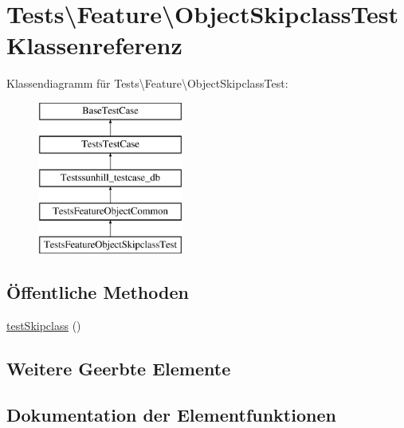 \hypertarget{classTests_1_1Feature_1_1ObjectSkipclassTest}{}\section{Tests\textbackslash{}Feature\textbackslash{}Object\+Skipclass\+Test Klassenreferenz}
\label{classTests_1_1Feature_1_1ObjectSkipclassTest}
Klassendiagramm für Tests\textbackslash{}Feature\textbackslash{}Object\+Skipclass\+Test\+:\begin{figure}[H]
\begin{center}
\leavevmode
\includegraphics[height=5.000000cm]{d2/d03/classTests_1_1Feature_1_1ObjectSkipclassTest}
\end{center}
\end{figure}
\subsection*{Öffentliche Methoden}
\begin{DoxyCompactItemize}
\item 
\hyperlink{classTests_1_1Feature_1_1ObjectSkipclassTest_ae3e1c1ec60593dc36f2457b98141219f}{test\+Skipclass} ()
\end{DoxyCompactItemize}
\subsection*{Weitere Geerbte Elemente}


\subsection{Dokumentation der Elementfunktionen}
\mbox{\label{classTests_1_1Feature_1_1ObjectSkipclassTest_ae3e1c1ec60593dc36f2457b98141219f}} 
